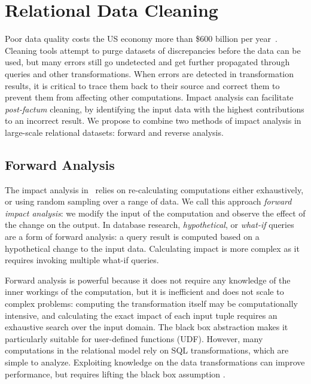 \section{Relational Data Cleaning} %
\label{sec:bi_directional}

Poor data quality costs the US economy more than \$600 billion per year~\cite{eckerson2002}. Cleaning tools attempt to purge datasets of discrepancies before the data can be used, but many errors still go undetected and get further propagated through queries and other transformations. When errors are detected in transformation results, it is critical to trace them back to their source and correct them to prevent them from affecting other computations. Impact analysis can facilitate \emph{post-factum} cleaning, by identifying the input data with the highest contributions to an incorrect result. We propose to combine two methods of impact analysis in large-scale relational datasets: forward and reverse analysis.

\subsection{Forward Analysis} %
\label{sub:forward_analysis}
The impact analysis in \checkcell\ relies on re-calculating computations either exhaustively, or using random sampling over a range of data. We call this approach \emph{forward impact analysis}: we modify the input of the computation and observe the effect of the change on the output. 
In database research, \emph{hypothetical}, or \emph{what-if} queries \cite{DBLP:conf/vldb/BalminPP00,DBLP:conf/icde/LakshmananRS08} are a form of forward analysis: a query result is computed based on a hypothetical change to the input data.  Calculating impact is more complex as it requires invoking multiple what-if queries. 

Forward analysis is powerful because it does not require any knowledge of the inner workings of the computation, but it is inefficient and does not scale to complex problems: computing the transformation itself may be computationally intensive, and calculating the exact impact of each input tuple requires an exhaustive search over the input domain. The black box abstraction makes it particularly suitable for user-defined functions (UDF). However, many computations in the relational model rely on SQL transformations, which are simple to analyze. Exploiting knowledge on the data transformations can improve performance, but requires lifting the black box assumption .


